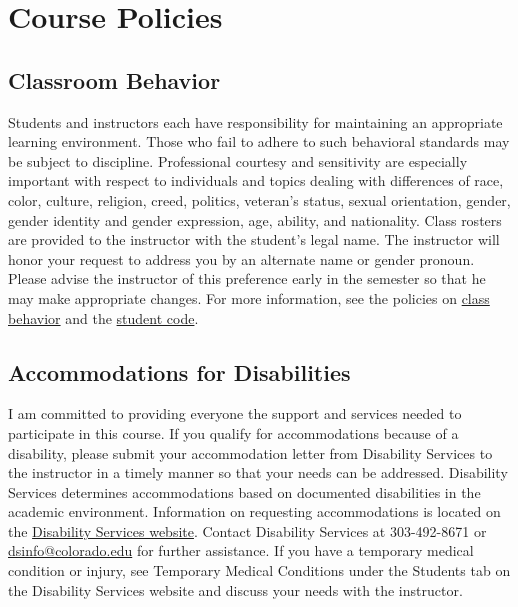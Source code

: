 \documentclass[11pt]{memoir}
\begin{document}
\begin{description}[itemsep=.5em,labelindent=1em]
    \end{description}

\section{Course Policies}

\subsection{Classroom Behavior}
Students and instructors each have responsibility for maintaining an appropriate learning environment. Those who fail to adhere to such behavioral standards may be subject to discipline. Professional courtesy and sensitivity are especially important with respect to individuals and topics dealing with differences of race, color, culture, religion, creed, politics, veteran’s status, sexual orientation, gender, gender identity and gender expression, age, ability, and nationality. Class rosters are provided to the instructor with the student's legal name. The instructor will honor your request to address you by an alternate name or gender pronoun. Please advise the instructor of this preference early in the semester so that he may make appropriate changes. For more information, see the policies on \href{http://www.colorado.edu/policies/student-classroom-and-course-related-behavior}{class behavior} and the \href{http://www.colorado.edu/osc/#student_code}{student code}.

\subsection{Accommodations for Disabilities}
I am committed to providing everyone the support and services needed to participate in this course. If you qualify for accommodations because of a disability, please submit your accommodation letter from Disability Services to the instructor in a timely manner so that your needs can be addressed. Disability Services determines accommodations based on documented disabilities in the academic environment. Information on requesting accommodations is located on the \href{www.colorado.edu/disabilityservices/students}{Disability Services website}. Contact Disability Services at 303-492-8671 or \href{mailto:dsinfo@colorado.edu}{dsinfo@colorado.edu} for further assistance. If you have a temporary medical condition or injury, see Temporary Medical Conditions under the Students tab on the Disability Services website and discuss your needs with the instructor.
\end{document}
